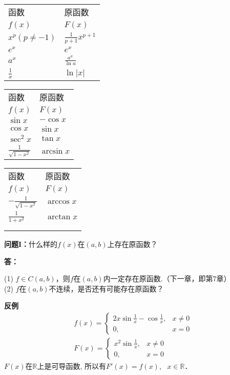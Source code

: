 \documentclass[a4paper,punct=CCT]{ctexbook}
\theoremstyle{definition}
\theoremstyle{remark}
\begin{document}
\begin{table*}[h]
  \caption*{原函数表}
  \centering
  \begin{tabular}{ l l }
    函数			&	原函数 \\
    $f(x)$			&	$F(x)$ \\
    $x^p(p\ne-1)$	&	$\frac{1}{p+1} x^{p+1}$ \\
    $e^x$			&	$e^x$ \\
    $a^x$			&	$\frac{a^x}{\ln a}$ \\
    $\frac{1}{x}$	&	$\ln |x|$
  \end{tabular}
  \begin{tabular}{ l l }
    函数						&	原函数 \\
    $f(x)$						&	$F(x)$ \\
    $\sin x$					&	$-\cos x$ \\
    $\cos x$					&	$\sin x$ \\
    $\sec^2 x$					&	$\tan x$ \\
    $\frac{1}{\sqrt{1-x^2}}$	&	$\arcsin x$
  \end{tabular}
  \begin{tabular}{ l l }
    函数						&	原函数 \\
    $f(x)$						&	$F(x)$ \\
    $-\frac{1}{\sqrt{1-x^2}}$	&	$\arccos x$ \\
    $\frac{1}{1+x^2}$			&	$\arctan x$ \\ \\ {}
  \end{tabular}
\end{table*}

\textbf{问题I：}什么样的$f(x)$在$(a,b)$上存在原函数？

\textbf{答：}\parbox[t]{5in}{
(1) $ f \in C(a,b) $，则$ f $在$(a,b)$内一定存在原函数.（下一章，即第7章）\\
(2) $f$在$(a,b)$不连续，是否还有可能存在原函数？}

\hypertarget{eg:discontI}{}
\textbf{反例}
\begin{gather*}
	f(x) =
	\begin{cases}
		2x \sin \frac{1}{x} - \cos \frac{1}{x}, & x \ne 0 \\
		0, & x = 0
	\end{cases} \\
	F(x) =
	\begin{cases}
		x^2 \sin \frac{1}{x}, & x \ne 0 \\
		0, & x = 0
	\end{cases}
\end{gather*}
$F(x)$在$\mathbb{R}$上是可导函数, 所以有$F'(x) = f(x)$, \ $x \in \mathbb{R}$．
\end{document}
